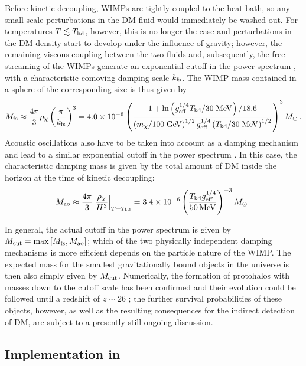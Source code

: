 Before kinetic decoupling, WIMPs are tightly coupled to the heat bath, so
any small-scale perturbations in the DM fluid would immediately be washed out.
For temperatures $T\lesssim T_{\rm kd}$, however, this is no longer the case and perturbations
 in the DM density start to devolop under the influence of gravity; however, the 
remaining viscous coupling between the two fluids and, subsequently, the free-streaming 
of the WIMPs generate an exponential cutoff in the power spectrum \cite{Green:2005fa}, 
with a characteristic comoving damping scale $k_{\rm fs}$. The WIMP mass contained in a 
sphere of the corresponding size is thus given by \cite{Bringmann:2009vf}
\begin{equation}
   M_{\rm fs}\approx\frac{4\pi}{3}\rho_\chi\left(\frac{\pi}{k_{\rm fs}}\right)^3
=4.0\times 10^{-6}\left(\frac{1+{\rm ln}\left(g_{\rm eff}^{1/4}T_{\rm kd}/30\;{\rm MeV}\right)/18.6}{\left(m_\chi/100\; {\rm GeV}\right)^{1/2} g_{\rm eff}^{1/4}\left(T_{\rm kd}/30\;{\rm MeV}\right)^{1/2}}\right)^3M_\odot\,.
\end{equation}
Acoustic oscillations also have to be taken into account as a damping mechanism 
and lead to a similar exponential cutoff in the power spectrum
\cite{Loeb:2005pm,Bertschinger:2006nq}. In this case, the characteristic damping mass 
 is given by the total amount of DM inside the horizon at the time of kinetic decoupling:
\begin{equation}
  M_{\rm ao}\approx\frac{4\pi}{3}\left.\frac{\rho_\chi}{H^3}\right|_{T=T_{\rm{kd}}}
  =3.4\times10^{-6}\left(\frac{T_{\rm kd}g_{\rm eff}^{1/4}}{50\,{\rm MeV}}\right)^{-3}M_\odot\,.
\end{equation}

In general, the actual cutoff in the power spectrum is  given by
$M_{\rm cut}=\max\left[M_{\rm fs},M_{\rm ao}\right]$; which of the two
physically independent damping mechanisms is more efficient depends on the 
particle nature of the WIMP. 
The expected mass for the smallest gravitationally bound objects in the 
universe is then also simply given by $M_{\rm cut}$. Numerically, the formation of 
protohalos with masses down to the cutoff scale has been confirmed
and their evolution could be 
followed until a redshift of $z\sim26$ \cite{Diemand:2005vz}; the further survival 
probabilities of these objects, however, as well as the resulting consequences for the indirect 
detection of DM, are subject to a presently still ongoing discussion.




\subsection{Implementation in \ds}

